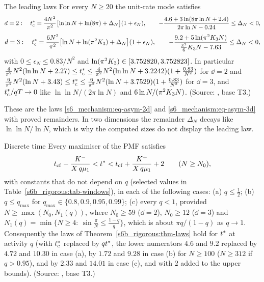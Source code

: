 \begin{catheorem}{The leading laws}\label{s6b_rigorous:thm-laws}
For every $N\ge20$ the unit-rate mode satisfies
\[
d=2:\quad t^{*}_{\mathrm{c}}=\frac{4N^{2}}{\pi^{2}}\bigl[\ln\ln N+\ln(8\pi)+\Delta_N\bigr](1+\epsilon_N),\qquad
-\frac{4.6+3\ln(8\pi\ln N+2.4)}{2\pi\ln N-0.24}\le \Delta_N<0,
\]
\[
d=3:\quad t^{*}_{\mathrm{c}}=\frac{6N^{2}}{\pi^{2}}\bigl[\ln N+\ln(\pi^{2}K_{3})+\Delta_N\bigr](1+\epsilon_N),\qquad
-\frac{9.2+5\ln(\pi^{2}K_{3} N)}{\frac{\pi^{2}}{6}K_{3} N-7.63}\le \Delta_N<0,
\]
with $0\le\epsilon_N\le0.83/N^{2}$ and $\ln(\pi^{2}K_{3})\in[3.752820,3.752823]$. In particular
$\frac{4}{\pi^{2}}N^{2}(\ln\ln N+2.27)\le t^{*}_{\mathrm{c}}\le\frac{4}{\pi^{2}}N^{2}(\ln\ln N+3.2242)(1+\frac{0.83}{N^{2}})$ for
$\dd=2$ and $\frac{6}{\pi^{2}}N^{2}(\ln N+3.43)\le t^{*}_{\mathrm{c}}\le\frac{6}{\pi^{2}}N^{2}(\ln N+3.7529)(1+\frac{0.83}{N^{2}})$
for $\dd=3$, and $t^{*}_{\mathrm{c}}/qT\to0$ like $\ln\ln N/(2\pi\ln N)$ and $6\ln N/(\pi^{2}K_{3} N)$.
\textup{(Source: , base T3.)}
\end{catheorem}

These are the laws \eqref{s6_mechanism:eq-asym-2d} and \eqref{s6_mechanism:eq-asym-3d} with proved remainders. In two
dimensions the remainder $\Delta_N$ decays like $\ln\ln N/\ln N$, which is why the computed sizes do not display the leading
law.

\begin{catheorem}{Discrete time}\label{s6b_rigorous:thm-disc}
Every maximiser of the PMF satisfies
\[
t_{\mathrm{cf}}-\frac{K^{-}}{X\,q\mu_{1}}<t^{*}<t_{\mathrm{cf}}+\frac{K^{+}}{X\,q\mu_{1}}+2\qquad(N\ge N_0),
\]
with constants that do not depend on $q$ (selected values in Table~\ref{s6b_rigorous:tab-windows}), in each of the
following cases: (a) $q\le\frac12$; (b) $q\le q_{\max}$ for $q_{\max}\in\{0.8,0.9,0.95,0.99\}$;
(c) every $q<1$, provided $N\ge\max(N_0,N_1(q))$, where $N_0\ge59$ ($\dd=2$), $N_0\ge12$ ($\dd=3$) and
$N_1(q)=\min\{N\ge4:\ \sin\frac\pi N\le\frac{1-q}{q}\}$, which is about $\pi q/(1-q)$ as $q\to1$.
Consequently the laws of Theorem~\ref{s6b_rigorous:thm-laws} hold for $t^{*}$ at activity $q$ (with $t^{*}_{\mathrm{c}}$ replaced by
$qt^{*}$, the lower numerators $4.6$ and $9.2$ replaced by $4.72$ and $10.30$ in case (a), by $1.72$ and $9.28$ in
case (b) for $N\ge100$ ($N\ge312$ if $q>0.95$), and by $2.33$ and $14.01$ in case (c), and with $2$ added to the upper
bounds).
\textup{(Source: , base T3.)}
\end{catheorem}

